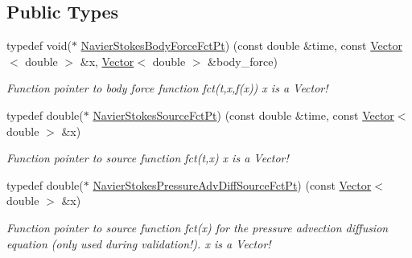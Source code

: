 \subsection*{Public Types}
\begin{DoxyCompactItemize}
\item 
typedef void($\ast$ \hyperlink{classoomph_1_1GeneralisedNewtonianNavierStokesEquations_a0076b2b1b6ad17d306907c959b3f4d12}{Navier\+Stokes\+Body\+Force\+Fct\+Pt}) (const double \&time, const \hyperlink{classoomph_1_1Vector}{Vector}$<$ double $>$ \&x, \hyperlink{classoomph_1_1Vector}{Vector}$<$ double $>$ \&body\+\_\+force)
\begin{DoxyCompactList}\small\item\em Function pointer to body force function fct(t,x,f(x)) x is a Vector! \end{DoxyCompactList}\item 
typedef double($\ast$ \hyperlink{classoomph_1_1GeneralisedNewtonianNavierStokesEquations_a817ff3b87362e53bf1d0594723b84573}{Navier\+Stokes\+Source\+Fct\+Pt}) (const double \&time, const \hyperlink{classoomph_1_1Vector}{Vector}$<$ double $>$ \&x)
\begin{DoxyCompactList}\small\item\em Function pointer to source function fct(t,x) x is a Vector! \end{DoxyCompactList}\item 
typedef double($\ast$ \hyperlink{classoomph_1_1GeneralisedNewtonianNavierStokesEquations_a8a3bc9bcca739b0f955f5b32e3154ac7}{Navier\+Stokes\+Pressure\+Adv\+Diff\+Source\+Fct\+Pt}) (const \hyperlink{classoomph_1_1Vector}{Vector}$<$ double $>$ \&x)
\begin{DoxyCompactList}\small\item\em Function pointer to source function fct(x) for the pressure advection diffusion equation (only used during validation!). x is a Vector! \end{DoxyCompactList}\end{DoxyCompactItemize}
